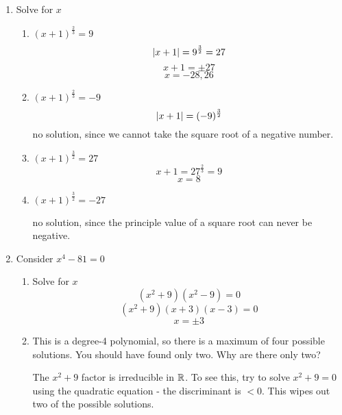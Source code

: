 \documentclass[letterpaper,12pt,fleqn]{article}
\begin{document}
\begin{enumerate}
\item Solve for $x$
  \begin{enumerate}
  \item $(x+1)^{\frac{2}{3}}=9$
    \[\lvert x+1\rvert=9^{\frac{3}{2}}=27\]
    \[x+1=\pm27\]
    \[x=-28,26\]
    
  \item $(x+1)^{\frac{2}{3}}=-9$
    \[\lvert x+1\rvert=(-9)^{\frac{3}{2}}\]
    no solution, since we cannot take the square root of a negative number.

    \bigskip

  \item $(x+1)^{\frac{3}{2}}=27$
    \[x+1=27^{\frac{2}{3}}=9\]
    \[x=8\]
    
  \item $(x+1)^{\frac{3}{2}}=-27$

    no solution, since the principle value of a square root can never be
    negative.
  \end{enumerate}

  \bigskip

\item Consider $x^4-81=0$
  \begin{enumerate}
  \item Solve for $x$
    \[(x^2+9)(x^2-9)=0\]
    \[(x^2+9)(x+3)(x-3)=0\]
    \[x=\pm3\]
    
  \item This is a degree-4 polynomial, so there is a maximum of four possible
    solutions. You should have found only two. Why are there only two?

    The $x^2+9$ factor is irreducible in $\mathbb{R}$. To see this, try to solve
    $x^2+9=0$ using the quadratic equation - the discriminant is $<0$. This
    wipes out two of the possible solutions.
  \end{enumerate}
  
\end{enumerate}
  
\end{document}

